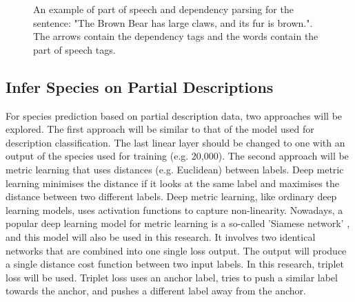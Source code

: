 \documentclass{article}
\begin{document}
\begin{figure} [t]
    \centering
    \vspace{-2.0cm}
    \makebox[\textwidth][c]{}
    \caption{An example of part of speech and dependency parsing for the sentence: "The Brown Bear has large claws, and its fur is brown.". The arrows contain the dependency tags and the words contain the part of speech tags.}
    \label{fig:PoS_example}
\end{figure}

\subsection{Infer Species on Partial Descriptions}
For species prediction based on partial description data, two approaches will be explored.
The first approach will be similar to that of the model used for description classification.
The last linear layer should be changed to one with an output of the species used for training (e.g. 20,000).
The second approach will be metric learning that uses distances (e.g. Euclidean) between labels.
Deep metric learning minimises the distance if it looks at the same label and maximises the distance between two different labels.
Deep metric learning, like ordinary deep learning models, uses activation functions to capture non-linearity.
Nowadays, a popular deep learning model for metric learning is a so-called 'Siamese network' \autocite{kaya_deep_2019}, and this model will also be used in this research.
It involves two identical networks that are combined into one single loss output.
The output will produce a single distance cost function between two input labels.
In this research, triplet loss \autocite{schroff_facenet_2015} will be used.
Triplet loss uses an anchor label, tries to push a similar label towards the anchor, and pushes a different label away from the anchor.
\end{document}
